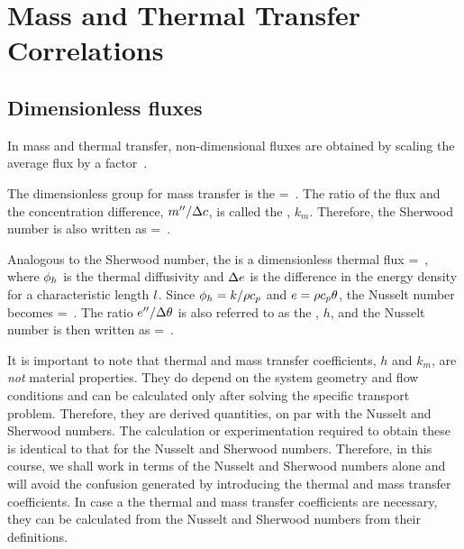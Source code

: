\section{Mass and Thermal Transfer Correlations}

\subsection{Dimensionless fluxes}
In mass and thermal transfer, non-dimensional fluxes are obtained by scaling the average flux by a factor
\beq
{}
      {}\,.
\eeq

The dimensionless group for mass transfer is the 
\beq
\ksherwood = \dfrac{\flux\mass}{\kdiff\Dx\conc/\length}\,.
\eeq
The ratio of the flux and the concentration difference, ${m}^{\prime\prime}/\Delta c$, is called the , $k_m$. Therefore, the Sherwood number is also written as
\beq
\ksherwood = \,.
\eeq

Analogous to the Sherwood number, the  is a dimensionless thermal flux
\beq
\knusselt = \,,
\eeq
where $\phi_h$ is the thermal diffusivity and $\Delta e$ is the difference in the energy density for a characteristic length $l$. Since $\phi_h = k/\rho c_p$ and $e = \rho c_p\theta$, the Nusselt number becomes
\beq
\knusselt = \dfrac{\flux\then}{\kthcond\Dx\temp/\length}\,.
\eeq
The ratio ${e}^{\prime\prime}/\Delta\theta$ is also referred to as the , $h$, and the Nusselt number is then written as
\beq
\knusselt = \,.
\eeq

It is important to note that thermal and mass transfer coefficients, $h$ and $k_m$, are \emph{not} material properties. They do depend on the system geometry and flow conditions and can be calculated only after solving the specific transport problem. Therefore, they are derived quantities, on par with the Nusselt and Sherwood numbers. The calculation or experimentation required to obtain these is identical to that for the Nusselt and Sherwood numbers. Therefore, in this course, we shall work in terms of the Nusselt and Sherwood numbers alone and will avoid the confusion generated by introducing the thermal and mass transfer coefficients. In case a the thermal and mass transfer coefficients are necessary, they can be calculated from the Nusselt and Sherwood numbers from their definitions.


